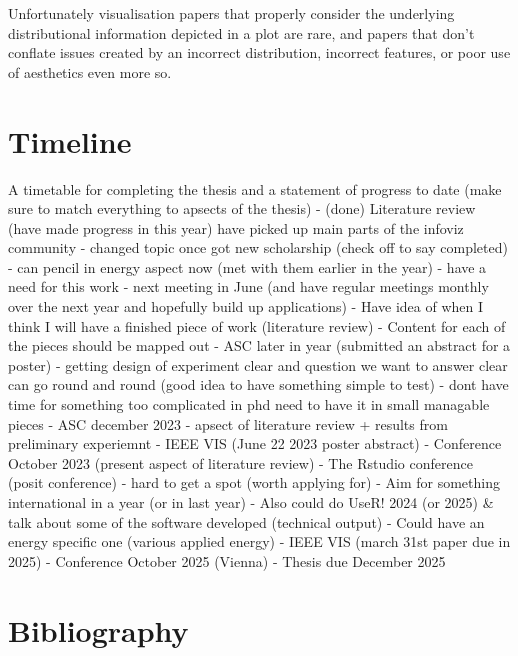 \documentclass[
  letterpaper,
  DIV=11,
  numbers=noendperiod]{scrartcl}
\begin{document}
Unfortunately visualisation papers that properly consider the underlying
distributional information depicted in a plot are rare, and papers that
don't conflate issues created by an incorrect distribution, incorrect
features, or poor use of aesthetics even more so.

\newpage{}

\hypertarget{timeline}{%
\section{Timeline}\label{timeline}}

A timetable for completing the thesis and a statement of progress to
date (make sure to match everything to apsects of the thesis) - (done)
Literature review (have made progress in this year) have picked up main
parts of the infoviz community - changed topic once got new scholarship
(check off to say completed) - can pencil in energy aspect now (met with
them earlier in the year) - have a need for this work - next meeting in
June (and have regular meetings monthly over the next year and hopefully
build up applications) - Have idea of when I think I will have a
finished piece of work (literature review) - Content for each of the
pieces should be mapped out - ASC later in year (submitted an abstract
for a poster) - getting design of experiment clear and question we want
to answer clear can go round and round (good idea to have something
simple to test) - dont have time for something too complicated in phd
need to have it in small managable pieces - ASC december 2023 - apsect
of literature review + results from preliminary experiemnt - IEEE VIS
(June 22 2023 poster abstract) - Conference October 2023 (present aspect
of literature review) - The Rstudio conference (posit conference) - hard
to get a spot (worth applying for) - Aim for something international in
a year (or in last year) - Also could do UseR! 2024 (or 2025) \& talk
about some of the software developed (technical output) - Could have an
energy specific one (various applied energy) - IEEE VIS (march 31st
paper due in 2025) - Conference October 2025 (Vienna) - Thesis due
December 2025

\newpage{}

\hypertarget{bibliography}{%
\section*{Bibliography}\label{bibliography}}
\end{document}
